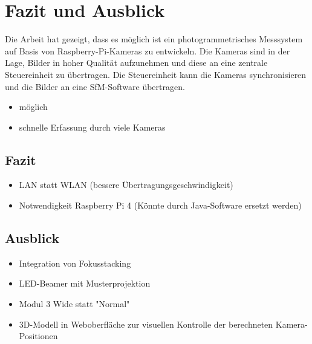 \documentclass[./00PhotoBox.tex]{subfiles}
\begin{document}
\chapter{Fazit und Ausblick}

Die Arbeit hat gezeigt, dass es möglich ist ein photogrammetrisches Messsystem auf Basis von Raspberry-Pi-Kameras zu entwickeln. Die Kameras sind in der Lage, Bilder in hoher Qualität aufzunehmen und diese an eine zentrale Steuereinheit zu übertragen. Die Steuereinheit kann die Kameras synchronisieren und die Bilder an eine SfM-Software übertragen.

\begin{itemize}
    \item möglich
    \item schnelle Erfassung durch viele Kameras
\end{itemize}

\section{Fazit}
\begin{itemize}
    \item LAN statt WLAN (bessere Übertragungsgeschwindigkeit)
    \item Notwendigkeit Raspberry Pi 4 (Könnte durch Java-Software ersetzt werden)
\end{itemize}

\section{Ausblick}
\label{s:ausblick}
\begin{itemize}
    \item Integration von Fokusstacking
    \item LED-Beamer mit Musterprojektion
    \item Modul 3 Wide statt "Normal"
    \item 3D-Modell in Weboberfläche zur visuellen Kontrolle der berechneten Kamera-Positionen
\end{itemize}

\biblio
\end{document}
